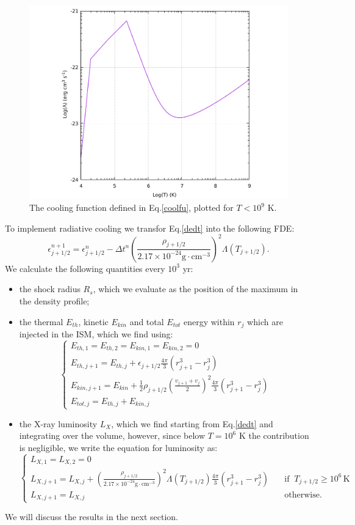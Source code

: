 \documentclass{article}
\begin{document}
\begin{figure}[H]
	\centering
	\includegraphics[width=0.7 \linewidth]{coolfunction.pdf}
	\caption{The cooling function defined in Eq.\eqref{coolfu}, plotted for $T<10^9$ K.}
	\label{fig:coolf}
\end{figure}
To implement radiative cooling we transfor Eq.\eqref{dedt} into the following FDE:
\begin{equation}
	\epsilon^{n+1}_{j+1/2}=\epsilon^{n}_{j+1/2}-\Delta t^n\left(\frac{\rho_{j+1/2}}{2.17\times 10^{-24}\text{g}\cdot\text{cm}^{-3}}\right)^2\Lambda(T_{j+1/2}).
\end{equation}
We calculate the following quantities every $10^3$ yr:
\begin{itemize}
	\item the shock radius $R_s$, which we evaluate as the position of the maximum in the density profile;
	\item the thermal $E_{th}$, kinetic $E_{kin}$ and total $E_{tot}$ energy within $r_j$ which are injected in the ISM, which we find using:
			\begin{equation}
				\begin{cases}
					E_{th,1}=E_{th,2}=E_{kin,1}=E_{kin,2}=0\\
					E_{th,j+1}=E_{th,j}+\epsilon_{j+1/2}\frac{4\pi}{3}(r_{j+1}^3-r^3_j)\\
					E_{kin,j+1}=E_{kin}+\frac{1}{2}\rho_{j+1/2}\left(\frac{v_{j+1}+v_j}{2}\right)^2\frac{4\pi}{3}(r_{j+1}^3-r^3_j)\\
					E_{tot,j}=E_{th,j}+E_{kin,j}
				\end{cases}
			\end{equation} 
	\item the X-ray luminosity $L_X$, which we find starting from Eq.\eqref{dedt} and integrating over the volume, however, since below $T=10^6$ K the contribution is negligible, we write the equation for luminosity as:
	\begin{equation}
		\begin{cases}
			L_{X,1}=L_{X,2}=0\\
			L_{X,j+1}=L_{X,j}+\left(\frac{\rho_{j+1/2}}{2.17\times 10^{-24}\text{g}\cdot\text{cm}^{-3}}\right)^2\Lambda(T_{j+1/2})\frac{4\pi}{3}(r_{j+1}^3-r^3_j)\quad &\text{if} \; \;T_{j+1/2}\ge10^6\,\text{K}\\
			L_{X,j+1}=L_{X,j} &\text{otherwise}.
		\end{cases}
	\end{equation} 
\end{itemize}
We will discuss the results in the next section.
\end{document}
